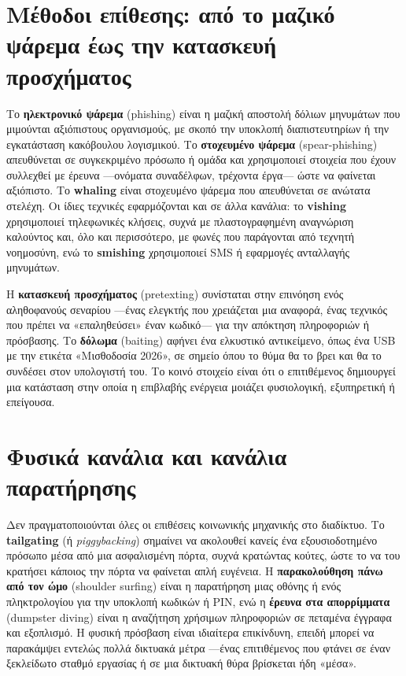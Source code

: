 \documentclass[11pt,openany]{book}
\begin{document}
\section{Μέθοδοι επίθεσης: από το μαζικό ψάρεμα έως την κατασκευή προσχήματος}\label{sec:5.2}
Το \textbf{ηλεκτρονικό ψάρεμα} (phishing) είναι η μαζική αποστολή δόλιων μηνυμάτων που μιμούνται αξιόπιστους οργανισμούς, με σκοπό την υποκλοπή διαπιστευτηρίων ή την εγκατάσταση κακόβουλου λογισμικού. Το \textbf{στοχευμένο ψάρεμα} (spear-phishing) απευθύνεται σε συγκεκριμένο πρόσωπο ή ομάδα και χρησιμοποιεί στοιχεία που έχουν συλλεχθεί με έρευνα —ονόματα συναδέλφων, τρέχοντα έργα— ώστε να φαίνεται αξιόπιστο. Το \textbf{whaling} είναι στοχευμένο ψάρεμα που απευθύνεται σε ανώτατα στελέχη. Οι ίδιες τεχνικές εφαρμόζονται και σε άλλα κανάλια: το \textbf{vishing} χρησιμοποιεί τηλεφωνικές κλήσεις, συχνά με πλαστογραφημένη αναγνώριση καλούντος και, όλο και περισσότερο, με φωνές που παράγονται από τεχνητή νοημοσύνη, ενώ το \textbf{smishing} χρησιμοποιεί SMS ή εφαρμογές ανταλλαγής μηνυμάτων.

Η \textbf{κατασκευή προσχήματος} (pretexting) συνίσταται στην επινόηση ενός αληθοφανούς σεναρίου —ένας ελεγκτής που χρειάζεται μια αναφορά, ένας τεχνικός που πρέπει να «επαληθεύσει» έναν κωδικό— για την απόκτηση πληροφοριών ή πρόσβασης. Το \textbf{δόλωμα} (baiting) αφήνει ένα ελκυστικό αντικείμενο, όπως ένα USB με την ετικέτα «Μισθοδοσία 2026», σε σημείο όπου το θύμα θα το βρει και θα το συνδέσει στον υπολογιστή του. Το κοινό στοιχείο είναι ότι ο επιτιθέμενος δημιουργεί μια κατάσταση στην οποία η επιβλαβής ενέργεια μοιάζει φυσιολογική, εξυπηρετική ή επείγουσα.

\section{Φυσικά κανάλια και κανάλια παρατήρησης}\label{sec:5.3}
Δεν πραγματοποιούνται όλες οι επιθέσεις κοινωνικής μηχανικής στο διαδίκτυο. Το \textbf{tailgating} (ή \emph{piggybacking}) σημαίνει να ακολουθεί κανείς ένα εξουσιοδοτημένο πρόσωπο μέσα από μια ασφαλισμένη πόρτα, συχνά κρατώντας κούτες, ώστε το να του κρατήσει κάποιος την πόρτα να φαίνεται απλή ευγένεια. Η \textbf{παρακολούθηση πάνω από τον ώμο} (shoulder surfing) είναι η παρατήρηση μιας οθόνης ή ενός πληκτρολογίου για την υποκλοπή κωδικών ή PIN, ενώ η \textbf{έρευνα στα απορρίμματα} (dumpster diving) είναι η αναζήτηση χρήσιμων πληροφοριών σε πεταμένα έγγραφα και εξοπλισμό. Η φυσική πρόσβαση είναι ιδιαίτερα επικίνδυνη, επειδή μπορεί να παρακάμψει εντελώς πολλά δικτυακά μέτρα —ένας επιτιθέμενος που φτάνει σε έναν ξεκλείδωτο σταθμό εργασίας ή σε μια δικτυακή θύρα βρίσκεται ήδη «μέσα».
\end{document}
